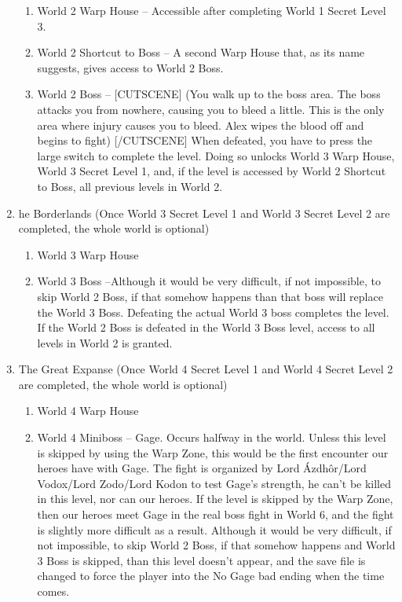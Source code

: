 \documentclass{gd-document}
\begin{document}
\begin{enumerate}
    \begin{enumerate}
    \item World 2 Warp House – Accessible after completing World 1
      Secret Level 3.

    \item World 2 Shortcut to Boss – A second Warp House that, as its
      name suggests, gives access to World 2 Boss.

    \item World 2 Boss – [CUTSCENE] (You walk up to the boss area. The
      boss attacks you from nowhere, causing you to bleed a
      little. This is the only area where injury causes you to
      bleed. Alex wipes the blood off and begins to fight) [/CUTSCENE]
      When defeated, you have to press the large switch to complete
      the level. Doing so unlocks World 3 Warp House, World 3 Secret
      Level 1, and, if the level is accessed by World 2 Shortcut to
      Boss, all previous levels in World 2.

    \end{enumerate}

  \item he Borderlands (Once World 3 Secret Level 1 and World 3
    Secret Level 2 are completed, the whole world is optional)

    \begin{enumerate}
    \item World 3 Warp House

    \item World 3 Boss –Although it would be very difficult, if not
      impossible, to skip World 2 Boss, if that somehow happens than
      that boss will replace the World 3 Boss. Defeating the actual
      World 3 boss completes the level. If the World 2 Boss is
      defeated in the World 3 Boss level, access to all levels in
      World 2 is granted.
    \end{enumerate}

  \item The Great Expanse (Once World 4 Secret Level 1 and World 4
    Secret Level 2 are completed, the whole world is optional)

    \begin{enumerate}
    \item World 4 Warp House

    \item World 4 Miniboss – Gage. Occurs halfway in the
      world. Unless this level is skipped by using the Warp Zone, this
      would be the first encounter our heroes have with Gage. The
      fight is organized by Lord Ázdhôr/Lord Vodox/Lord Zodo/Lord
      Kodon to test Gage's strength, he can't be killed in this level,
      nor can our heroes. If the level is skipped by the Warp Zone,
      then our heroes meet Gage in the real boss fight in World 6, and
      the fight is slightly more difficult as a result. Although it
      would be very difficult, if not impossible, to skip World 2
      Boss, if that somehow happens and World 3 Boss is skipped, than
      this level doesn't appear, and the save file is changed to force
      the player into the No Gage bad ending when the time comes.


\end{enumerate}
\end{enumerate}
\end{document}
